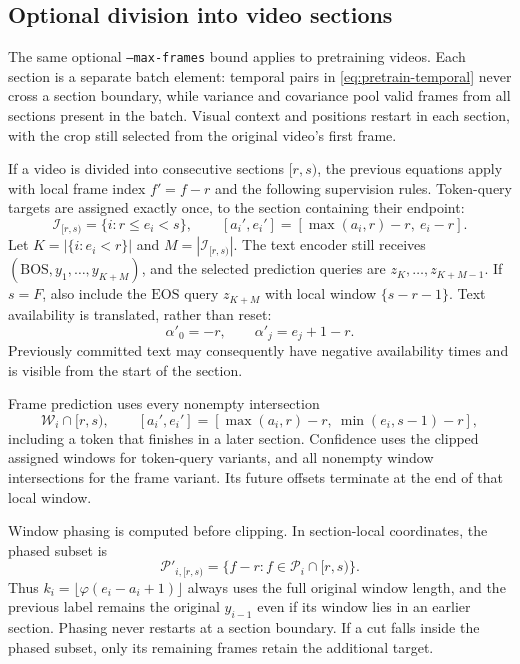 \documentclass[11pt,a4paper]{article}
\newcommand{\BOS}{\mathrm{BOS}}
\newcommand{\EOS}{\mathrm{EOS}}
\numberwithin{equation}{section}
\begin{document}
\subsection{Optional division into video sections}
\label{sec:sections}

The same optional \texttt{--max-frames} bound applies to pretraining
videos. Each section is a separate batch element: temporal pairs in
\eqref{eq:pretrain-temporal} never cross a section boundary, while
variance and covariance pool valid frames from all sections present in
the batch. Visual context and positions restart in each section, with
the crop still selected from the original video's first frame.

If a video is divided into consecutive sections $[r,s)$, the previous
equations apply with local frame index $f'=f-r$ and the following
supervision rules. Token-query targets are assigned exactly once, to
the section containing their endpoint:
\begin{equation}
\mathcal I_{[r,s)}=\{i:r\leq e_i<s\},\qquad
[a_i',e_i']=[\max(a_i,r)-r,\ e_i-r].
\end{equation}
Let $K=|\{i:e_i<r\}|$ and $M=|\mathcal I_{[r,s)}|$.
The text encoder still receives
$(\BOS,y_1,\ldots,y_{K+M})$, and the selected prediction queries are
$z_K,\ldots,z_{K+M-1}$. If $s=F$, also include the $\EOS$ query
$z_{K+M}$ with local window $\{s-r-1\}$.
Text availability is translated, rather than reset:
\begin{equation}
\alpha'_0=-r,\qquad \alpha'_j=e_j+1-r.
\end{equation}
Previously committed text may consequently have negative availability
times and is visible from the start of the section.

Frame prediction uses every nonempty intersection
\begin{equation}
\mathcal W_i\cap[r,s),\qquad
[a_i',e_i']=[\max(a_i,r)-r,\ \min(e_i,s-1)-r],
\end{equation}
including a token that finishes in a later section. Confidence uses
the clipped assigned windows for token-query variants, and all
nonempty window intersections for the frame variant. Its future
offsets terminate at the end of that local window.

Window phasing is computed before clipping. In section-local coordinates,
the phased subset is
\begin{equation}
\mathcal P'_{i,[r,s)}
=\{f-r:f\in\mathcal P_i\cap[r,s)\}.
\label{eq:section-phasing}
\end{equation}
Thus $k_i=\lfloor\varphi(e_i-a_i+1)\rfloor$ always uses the full
original window length, and the previous label remains the original
$y_{i-1}$ even if its window lies in an earlier section. Phasing never
restarts at a section boundary. If a cut falls inside the phased subset,
only its remaining frames retain the additional target.
\end{document}

